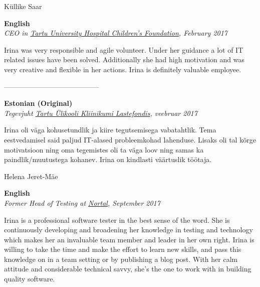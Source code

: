 \documentclass[a4paper, 12pt]{article}
\begin{document}
\newpage

\begin{center}
\LARGE{Küllike Saar}
\end{center}

\begin{center}
\textbf{English}\\
\textit{CEO in \href{https://www.lastefond.ee}{Tartu University Hospital Children's Foundation}, February 2017}
\end{center}

Irina was very responsible and agile volunteer. Under her guidance a lot of IT related issues have been solved. Additionally she had high motivation and was very creative and flexible in her actions. Irina is definitely valuable employee.

\begin{center}
\------------------------------------------
\end{center}

\begin{center}
\textbf{Estonian (Original)}\\
\textit{Tegevjuht \href{https://www.lastefond.ee}{Tartu Ülikooli Kliinikumi Lastefondis}, veebruar 2017}
\end{center}

Irina oli väga kohusetundlik ja kiire tegutsemisega vabatahtlik. Tema eestvedamisel said paljud IT-alased probleemkohad lahenduse. Lisaks oli tal kõrge motivatsioon ning oma tegemistes oli ta väga loov ning samas ka paindlik/muutustega kohanev. Irina on kindlasti väärtuslik töötaja.

\newpage

\begin{center}
\LARGE{Helena Jeret-Mäe}
\end{center}

\begin{center}
\textbf{English}\\
\textit{Former Head of Testing at \href{https://nortal.com}{Nortal}, September 2017}
\end{center}

Irina is a professional software tester in the best sense of the word. She is continuously developing and broadening her knowledge in testing and technology which makes her an invaluable team member and leader in her own right. Irina is willing to take the time and make the effort to learn new skills, and pass this knowledge on in a team setting or by publishing a blog post. With her calm attitude and considerable technical savvy, she's the one to work with in building quality software.
\end{document}
